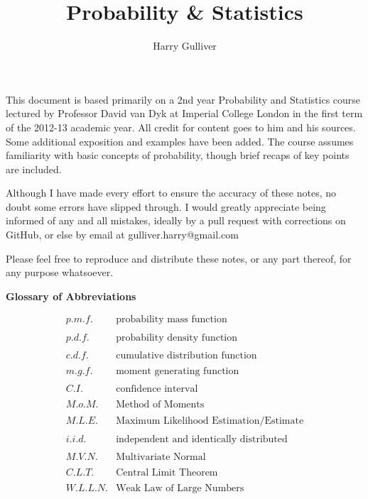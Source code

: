 \documentclass[12pt,a4paper]{article}
\title{Probability \& Statistics}
\author{Harry Gulliver}
\date{}
\begin{document}
\maketitle
{}
\pagestyle{fancyplain}

\cfoot{\thepage}



This document is based primarily on a 2nd year Probability and Statistics course lectured by Professor David van Dyk at Imperial College London in the first term of the 2012-13 academic year. All credit for content goes to him and his sources. Some additional exposition and examples have been added. The course assumes familiarity with basic concepts of probability, though brief recaps of key points are included.

Although I have made every effort to ensure the accuracy of these notes, no doubt some errors have slipped through. I would greatly appreciate being informed of any and all mistakes, ideally by a pull request with corrections on GitHub, or else by email at gulliver.harry@gmail.com

Please feel free to reproduce and distribute these notes, or any part thereof, for any purpose whatsoever.






\tableofcontents
\vspace{50pt}

{\Large\bf Glossary of Abbreviations}  %
\vspace{12pt}

$$\begin{array}{lr}
p.m.f. & \mbox{probability mass function}\\
 & \\
p.d.f. & \mbox{probability density function}\\
 & \\
c.d.f. & \mbox{cumulative distribution function}\\
 & \\
m.g.f. & \mbox{moment generating function}\\
 & \\
C.I. & \mbox{confidence interval}\\
 & \\
M.o.M. & \mbox{Method of Moments}\\
 & \\
M.L.E. & \mbox{Maximum Likelihood Estimation/Estimate}\\
 & \\
i.i.d. & \mbox{independent and identically distributed}\\
 & \\
M.V.N. & \mbox{Multivariate Normal}\\
 & \\
C.L.T. & \mbox{Central Limit Theorem}\\
 & \\
W.L.L.N. & \mbox{Weak Law of Large Numbers}
\end{array}$$
\end{document}
